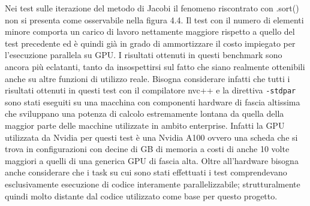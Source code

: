\documentclass[12pt,a4paper]{report}
\begin{document}
\begin{figure}[H]
\centering
\begin{floatrow}[1]
\end{floatrow}
\end{figure} 

Nei test sulle iterazione del metodo di Jacobi il fenomeno riscontrato con .sort() non si presenta come osservabile nella figura 4.4. Il test con il numero di elementi minore comporta un carico di lavoro nettamente maggiore rispetto a quello del test precedente ed è quindi già in grado di ammortizzare il costo impiegato per l'esecuzione parallela su GPU.
I risultati ottenuti in questi benchmark sono ancora più eclatanti, tanto da insospettirsi sul fatto che siano realmente ottenibili anche su altre funzioni di utilizzo reale. \newline
Bisogna considerare infatti che tutti i risultati ottenuti in questi test con il compilatore nvc++ e la direttiva \verb|-stdpar| sono stati eseguiti su una macchina con componenti hardware di fascia altissima che sviluppano una potenza di calcolo estremamente lontana da quella della maggior parte delle macchine utilizzate in ambito enterprise. Infatti la GPU utilizzata da Nvidia per questi test è una Nvidia A100 ovvero una scheda che si trova in configurazioni con decine di GB di memoria a costi di anche 10 volte maggiori a quelli di una generica GPU di fascia alta. \newline
Oltre all'hardware bisogna anche considerare che i task su cui sono stati effettuati i test comprendevano esclusivamente esecuzione di codice interamente parallelizzabile; strutturalmente quindi molto distante dal codice utilizzato come base per questo progetto.
\end{document}
